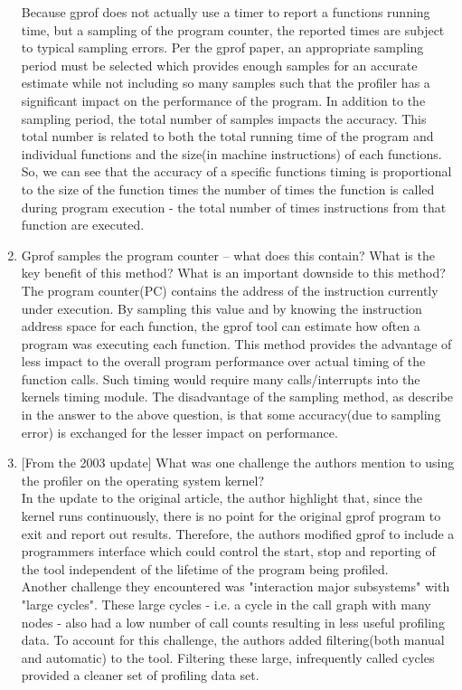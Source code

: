 \documentclass[11pt]{article}
\begin{document}
\begin{enumerate}
Because gprof does not actually use a timer to report a functions running time, but a sampling of the program counter, the reported times are subject to typical sampling errors. Per the gprof paper, an appropriate sampling period must be selected which provides enough samples for an accurate estimate while not including so many samples such that the profiler has a significant impact on the performance of the program. In addition to the sampling period, the total number of samples impacts the accuracy.  This total number is related to both the total running time of the program and individual functions and the size(in machine instructions) of each functions. So, we can see that the accuracy of a specific functions timing is proportional to the size of the function times the number of times the function is called during program execution - the total number of times instructions from that function are executed.\\

\item Gprof samples the program counter – what does this contain? What is the key benefit of this method? What is an important downside to this method?\\

The program counter(PC) contains the address of the instruction currently under execution.  By sampling this value and by knowing the instruction address space for each function, the gprof tool can estimate how often a program was executing each function. This method provides the advantage of less impact to the overall program performance over actual timing of the function calls. Such timing would require many calls/interrupts into the kernels timing module. The disadvantage of the sampling method, as describe in the answer to the above question, is that some accuracy(due to sampling error) is exchanged for the lesser impact on performance.\\

\item $[$From the 2003 update$]$ What was one challenge the authors mention to using the profiler on the operating system kernel?\\

In the update to the original article, the author highlight that, since the kernel runs continuously, there is no point for the original gprof program to exit and report out results.  Therefore, the authors modified gprof to include a programmers interface which could control the start, stop and reporting of the tool independent of the lifetime of the program being profiled.\\
Another challenge they encountered was "interaction major subsystems" with "large cycles".   These large cycles - i.e. a cycle in the call graph with many nodes - also had a low number of call counts resulting in less useful profiling data. To account for this challenge, the authors added filtering(both manual and automatic) to the tool. Filtering  these large, infrequently called cycles provided a cleaner set of profiling data set.\\


\end{enumerate}
\end{document}
